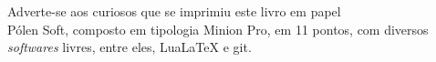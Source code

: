 \pagebreak

\ifodd\thepage\blankpage\fi

\mbox{}\vfill


\begin{center}
		\begin{minipage}{.7\textwidth}\tiny\noindent{}
		\centering\tiny
		Adverte-se aos curiosos que se imprimiu este 
		livro
		em papel \\ Pólen Soft, composto em tipologia Minion Pro, em 11 pontos,
		com diversos \textit{softwares} livres, 
		entre eles, {Lua\LaTeX} e git.\\ 
		\medskip\\\
		\end{minipage}
\end{center}
